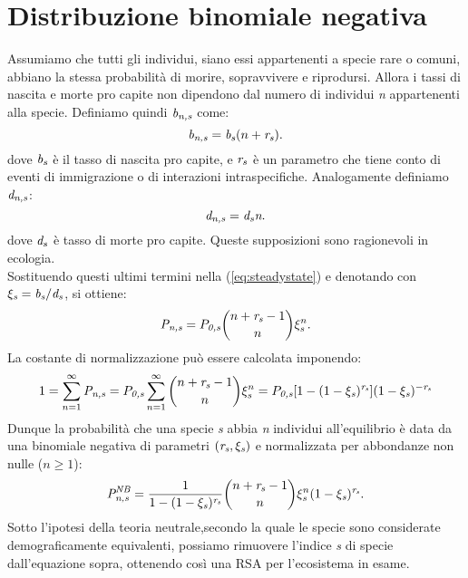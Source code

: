 \section{Distribuzione binomiale negativa}
Assumiamo che tutti gli individui, siano essi appartenenti a specie rare o comuni, abbiano la stessa probabilità di morire, sopravvivere e riprodursi. Allora i tassi di nascita e morte pro capite non dipendono dal numero di individui \emph{n} appartenenti alla specie.
Definiamo quindi $\emph{b}_\emph{{n,s}}$ come:
\begin{equation}
\emph{b}_\emph{n,s}=\emph{b}_\emph{s}(n+\emph{r}_\emph{s}).
\label{eq:birthNB}
\end{equation}
dove $\emph{b}_\emph{s}$ è il tasso di nascita pro capite, e $\emph{r}_\emph{s}$ è un parametro che tiene conto di eventi di immigrazione o di interazioni intraspecifiche.\newline
Analogamente definiamo $\emph{d}_\emph{n,s}$: 
\begin{equation}
\emph{d}_\emph{n,s}=\emph{d}_\emph{s}\emph{n}.
\label{eq:deathNB}
\end{equation}
dove $\emph{d}_\emph{s}$ è tasso di morte pro capite.
Queste supposizioni sono ragionevoli in ecologia.\\
Sostituendo questi ultimi termini nella (\ref{eq:steadystate}) e denotando con $\xi_\emph{s}=\emph{b}_\emph{s}/\emph{d}_\emph{s}$, si ottiene:
$$
\emph{P}_\emph{n,s}=P_\emph{0,s}\binom{n+\emph{r}_\emph{s}-1}{n}\xi_\emph{s}^n.
$$
La costante di normalizzazione può essere calcolata imponendo:
$$
1=\sum_{n=1}^\infty \emph{P}_{\emph{n,s}}=P_\emph{0,s}\sum_{n=1}^\infty\binom{n+\emph{r}_\emph{s}-1}{n}\xi_\emph{s}^n=P_\emph{0,s}[1-(1-\xi_\emph{s})^{\emph{r}_\emph{s}}](1-\xi_\emph{s})^{-\emph{r}_\emph{s}}
$$
Dunque la probabilità che una specie \emph{s} abbia \emph{n} individui all'equilibrio è data da una binomiale negativa di parametri $(\emph{r}_\emph{s}, \xi_\emph{s})$ e normalizzata per abbondanze non nulle ($n\ge 1$):
\begin{equation}
\emph{P}_\emph{n,s}^{\emph{NB}}=\frac{1}{1-(1-\xi_\emph{s})^{\emph{r}_\emph{s}}}\binom{n+\emph{r}_\emph{s}-1}{n}\xi_\emph{s}^n(1-\xi_\emph{s})^{\emph{r}_\emph{s}}.
\label{eq:NBprobability}
\end{equation}
Sotto l'ipotesi della teoria neutrale,secondo la quale le specie sono considerate demograficamente equivalenti, possiamo rimuovere l'indice \emph{s} di specie dall'equazione sopra, ottenendo così una RSA per l'ecosistema in esame.

